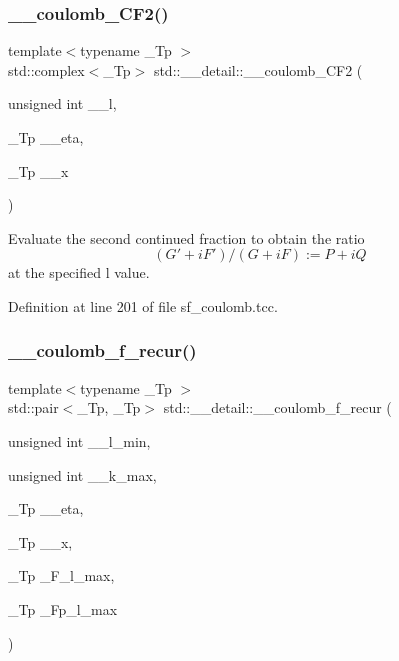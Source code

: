 \subsubsection{\texorpdfstring{\+\_\+\+\_\+coulomb\+\_\+\+C\+F2()}{\_\_coulomb\_CF2()}}
{\footnotesize\ttfamily template$<$typename \+\_\+\+Tp $>$ \\
std\+::complex$<$\+\_\+\+Tp$>$ std\+::\+\_\+\+\_\+detail\+::\+\_\+\+\_\+coulomb\+\_\+\+C\+F2 (\begin{DoxyParamCaption}\item[{unsigned int}]{\+\_\+\+\_\+l,  }\item[{\+\_\+\+Tp}]{\+\_\+\+\_\+eta,  }\item[{\+\_\+\+Tp}]{\+\_\+\+\_\+x }\end{DoxyParamCaption})}

Evaluate the second continued fraction to obtain the ratio \[ (G' + i F') / (G + i F) := P + i Q \] at the specified l value. 

Definition at line 201 of file sf\+\_\+coulomb.\+tcc.

\mbox{\label{namespacestd_1_1____detail_ab6a730206fba9db024f3c1c26fe6a954}} 
\subsubsection{\texorpdfstring{\+\_\+\+\_\+coulomb\+\_\+f\+\_\+recur()}{\_\_coulomb\_f\_recur()}}
{\footnotesize\ttfamily template$<$typename \+\_\+\+Tp $>$ \\
std\+::pair$<$\+\_\+\+Tp, \+\_\+\+Tp$>$ std\+::\+\_\+\+\_\+detail\+::\+\_\+\+\_\+coulomb\+\_\+f\+\_\+recur (\begin{DoxyParamCaption}\item[{unsigned int}]{\+\_\+\+\_\+l\+\_\+min,  }\item[{unsigned int}]{\+\_\+\+\_\+k\+\_\+max,  }\item[{\+\_\+\+Tp}]{\+\_\+\+\_\+eta,  }\item[{\+\_\+\+Tp}]{\+\_\+\+\_\+x,  }\item[{\+\_\+\+Tp}]{\+\_\+\+F\+\_\+l\+\_\+max,  }\item[{\+\_\+\+Tp}]{\+\_\+\+Fp\+\_\+l\+\_\+max }\end{DoxyParamCaption})}

